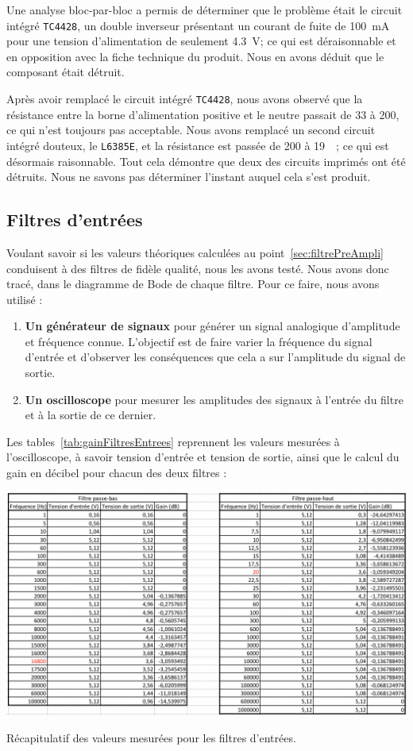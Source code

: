 \documentclass[10pt, oneside, a4paper]{article}
\begin{document}
Une analyse bloc-par-bloc a permis de déterminer que le problème était le circuit intégré \verb|TC4428|, un double inverseur présentant un courant de fuite de \SI{100}{\milli\ampere} pour une tension d'alimentation de seulement \SI{4.3}{\volt};
ce qui est déraisonnable et en opposition avec la fiche technique du produit.
Nous en avons déduit que le composant était détruit.

Après avoir remplacé le circuit intégré \verb|TC4428|, nous avons observé que la résistance entre la borne d'alimentation positive et le neutre passait de \SI{33}{\Omega} à \SI{200}{\Omega}, ce qui n'est toujours pas acceptable.
Nous avons remplacé un second circuit intégré douteux, le \verb|L6385E|, et la résistance est passée de \SI{200}{\Omega} à \SI{19}{\kilo\Omega}; ce qui est désormais raisonnable.
Tout cela démontre que deux des circuits imprimés ont été détruits.
Nous ne savons pas déterminer l'instant auquel cela s'est produit.

\subsection{Filtres d'entrées}
Voulant savoir si les valeurs théoriques calculées au point~\ref{sec:filtrePreAmpli}
conduisent à des filtres de fidèle qualité, nous les avons testé.
Nous avons donc tracé, dans le diagramme de Bode de chaque filtre.
Pour ce faire, nous avons utilisé :
\begin{enumerate}
    \item\textbf{Un générateur de signaux} pour générer un signal analogique
        d'amplitude et fréquence connue.
        L'objectif est de faire varier la fréquence du signal d'entrée et d'observer les
        conséquences que cela a sur l'amplitude du signal de sortie.
    \item\textbf{Un oscilloscope} pour mesurer les amplitudes des signaux à l'entrée du
        filtre et à la sortie de ce dernier.
\end{enumerate}

Les tables~\ref{tab:gainFiltresEntrees} reprennent les valeurs mesurées à l'oscilloscope, à savoir tension d'entrée et tension de sortie, ainsi que le calcul du gain en décibel pour chacun des deux filtres :
\begin{table}[!ht]
    \centering
    \includegraphics[scale=0.57]{image/resultat-filtres.jpg}
    \caption{Récapitulatif des valeurs mesurées pour les filtres d'entrées.}
    \label{tab:gainFiltresEntrees}
\end{table}
\end{document}
